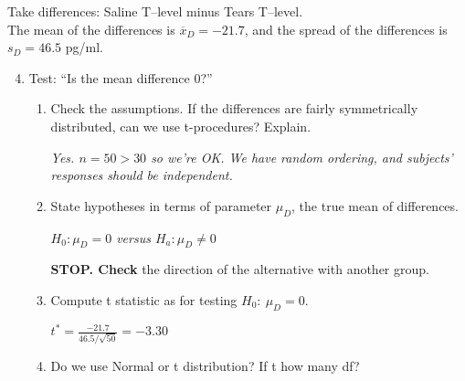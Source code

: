     Take differences: Saline T--level minus Tears T--level.\\
    The mean of the differences is  $\overline{x}_D = -21.7$, and
    the spread of the differences is  $s_D = 46.5$ pg/ml.
    \begin{enumerate}
  \setcounter{enumi}{3}
        \item Test: ``Is the mean difference 0?''
          \begin{enumerate}
            \item Check the assumptions. If the differences are
              fairly symmetrically distributed, can we use t-procedures?
              Explain. 
\begin{students}
    \vspace{2.8cm}    
\end{students}

\begin{key}
  {\it  Yes. $n=50 > 30$ so we're OK. We have random ordering, and 
     subjects' responses should be independent.} 
\end{key}

        \item State hypotheses in terms of parameter $\mu_D$, the
              true mean of differences.
\begin{students}
    \vspace{2cm}    
\end{students}

\begin{key}
  {\it  $H_0: \mu_D = 0$ versus $H_a: \mu_D \neq 0$}
\end{key}

    {\bf STOP.  Check} the direction of the alternative with another group.
    \item Compute t statistic as for  testing $H_0:\ \mu_D=0$.
\begin{students}
    \vspace{1.5cm}    
\end{students}

\begin{key}
  {\it  $t^* = \frac{ -21.7}{46.5/\sqrt{50}} = -3.30 $}
\end{key}

            \item Do we use Normal  or t distribution? 
              If t how many df?
\begin{students}
    \vspace{1cm}    
\end{students}


\end{enumerate}
\end{enumerate}
